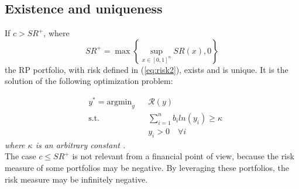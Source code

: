 \subsection{Existence and uniqueness}
\begin{theorem}
If $c > SR^+$, where
\begin{equation}
SR^+ = \max \left\{\sup_{x \in [0,1]^n} SR(x), 0\right\}
\end{equation}
the RP portfolio, with risk defined in (\ref{eq:risk2}), exists and is unique. It is the solution of the following optimization problem:
\end{theorem}
\begin{equation}
\begin{aligned}
& y^* = {\text{argmin}_y}
&& \mathcal{R}(y)\\
& \text{s.t.}
&&\sum_{i=1}^n b_i ln(y_i) \geq \kappa\\
&&&y_i > 0 \hspace{1em} \forall i
\end{aligned}
\end{equation}
\emph{where $\kappa$ is an arbitrary constant \cite{intr}.}\\
The case $c \leq SR^+$ is not relevant from a financial point of view, because the risk measure of some portfolios may be negative. By leveraging these portfolios, the risk measure may be infinitely negative.
